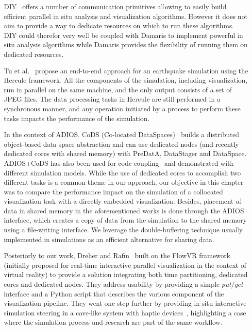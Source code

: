 DIY~\cite{Peterka11Scalable} offers a number of communication primitives
allowing to easily build efficient parallel in situ analysis and visualization algorithms.
However it does not aim to provide a way to dedicate resources on which to run these algorithms.
DIY could therefor very well be coupled with Damaris to implement powerful in situ
analysis algorithms while Damaris provides the flexibility of running them on dedicated resources.

Tu et al.~\cite{tu2006mesh} propose an end-to-end approach for an earthquake 
simulation using the Hercule framework. All the components of the simulation, 
including visualization, run in parallel on the same machine, and the 
only output consists of a set of JPEG files.
The data processing tasks in Hercule are still performed in a synchronous manner, 
and any operation initiated by a process to perform these tasks impacts the 
performance of the simulation.

In the context of ADIOS, CoDS (Co-located DataSpaces)~\cite{zhang2012situ} 
builds a distributed object-based data space abstraction 
and can use dedicated nodes (and recently dedicated cores with shared memory) 
with PreDatA, DataStager and DataSpace. 
ADIOS+CoDS has also been used for code coupling~\cite{zhang2012ipdps} 
and demonstrated with different simulation models.
While the use of dedicated cores to accomplish two different tasks is a common
theme in our approach, our objective in this chapter was to compare the performance impact on the 
simulation of a collocated visualization task with a directly embedded 
visualization.
Besides, placement of data in shared memory in the aforementioned works is done through 
the ADIOS interface, which creates a copy of data from the simulation to the 
shared memory using a file-writing interface. We leverage the double-buffering 
technique usually implemented in simulations as an efficient alternative for sharing data.

Posteriorly to our work, Dreher and Rafin~\cite{dreher2014flexible} built on the FlowVR 
framework (initially proposed for real-time interactive parallel visualization in 
the context of virtual reality) to provide a solution integrating both time partitioning,
dedicated cores and dedicated nodes. They address usability
by providing a simple \emph{put}/\emph{get} interface and a Python script that describes
the various component of the visualization pipeline. They went one step further by
providing in situ interactive simulation steering in a cave-like system with haptic
devices~\cite{dreher2014fd169}, highlighting a case where the simulation process
and research are part of the same workflow.
